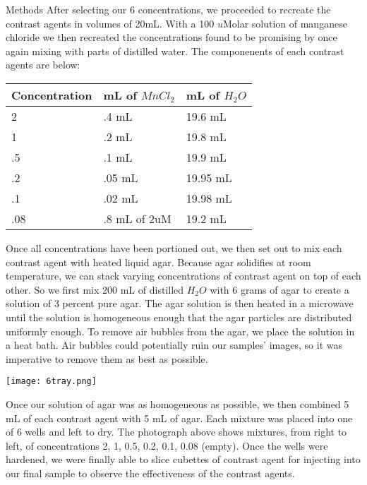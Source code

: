 \documentclass[a4paper,12pt]{article}
\begin{document}
\begin{section}{Methods}
After selecting our 6 concentrations, we proceeded to recreate the contrast agents in volumes of 20mL. With a 100 $u$Molar solution of manganese chloride we then recreated the concentrations found to be promising by once again mixing with parts of distilled water. The componenents of each contrast agents are below:

\begin{center}
    \begin{tabular}{ | l | l | p{2cm} |}
    \hline
    Concentration & mL of $MnCl_2$ & mL of $H_2O$ \\ \hline
    2 & .4 mL & 19.6 mL  \\ \hline
    1 & .2 mL & 19.8 mL \\ \hline
   .5 & .1 mL & 19.9 mL \\ \hline
   .2 & .05 mL & 19.95 mL \\ \hline
   .1 & .02 mL & 19.98 mL \\ \hline
   .08 & .8 mL of 2uM & 19.2 mL \\ \hline
    \end{tabular}
\end{center}

Once all concentrations have been portioned out, we then set out to mix each contrast agent with heated liquid agar. Because agar solidifies at room temperature, we can stack varying concentrations of contrast agent on top of each other. So we first mix 200 mL of distilled $H_2 O$ with 6 grams of agar to create a solution of 3 percent pure agar. The agar solution is then heated in a microwave until the solution is homogeneous enough that the agar particles are distributed uniformly enough. To remove air bubbles from the agar, we place the solution in a heat bath. Air bubbles could potentially ruin our samples' images, so it was imperative to remove them as best as possible.\\

\begin{center}
\texttt{[image: 6tray.png]}
\end{center}

Once our solution of agar was as homogeneous as possible, we then combined 5 mL of each contrast agent with 5 mL of agar. Each mixture was placed into one of 6 wells and left to dry. The photograph above shows mixtures, from right to left, of concentrations 2, 1, 0.5, 0.2, 0.1, 0.08 (empty). Once the wells were hardened, we were finally able to slice cubettes of contrast agent for injecting into our final sample to observe the effectiveness of the contrast agents.


\end{section}
\end{document}
